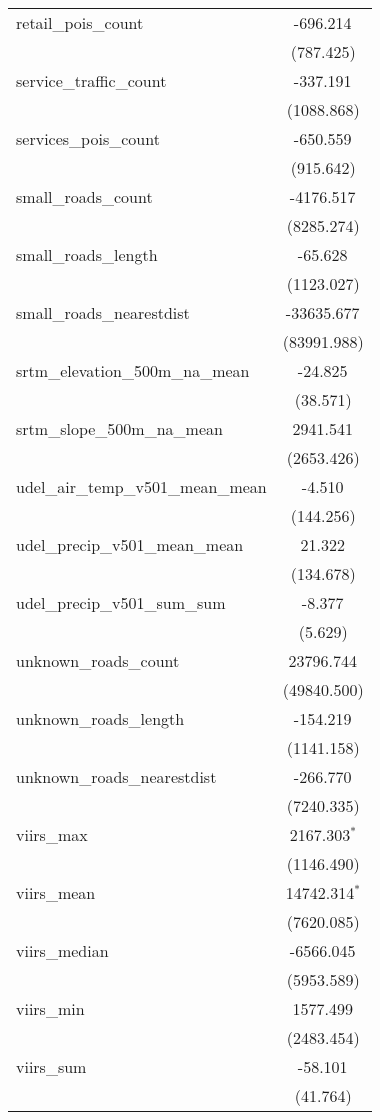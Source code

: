 \begin{table}[!htbp]
\begin{tabular}{@{\extracolsep{5pt}}lc}
 retail_pois_count & -696.214$^{}$ \\
  & (787.425) \\
 service_traffic_count & -337.191$^{}$ \\
  & (1088.868) \\
 services_pois_count & -650.559$^{}$ \\
  & (915.642) \\
 small_roads_count & -4176.517$^{}$ \\
  & (8285.274) \\
 small_roads_length & -65.628$^{}$ \\
  & (1123.027) \\
 small_roads_nearestdist & -33635.677$^{}$ \\
  & (83991.988) \\
 srtm_elevation_500m_na_mean & -24.825$^{}$ \\
  & (38.571) \\
 srtm_slope_500m_na_mean & 2941.541$^{}$ \\
  & (2653.426) \\
 udel_air_temp_v501_mean_mean & -4.510$^{}$ \\
  & (144.256) \\
 udel_precip_v501_mean_mean & 21.322$^{}$ \\
  & (134.678) \\
 udel_precip_v501_sum_sum & -8.377$^{}$ \\
  & (5.629) \\
 unknown_roads_count & 23796.744$^{}$ \\
  & (49840.500) \\
 unknown_roads_length & -154.219$^{}$ \\
  & (1141.158) \\
 unknown_roads_nearestdist & -266.770$^{}$ \\
  & (7240.335) \\
 viirs_max & 2167.303$^{*}$ \\
  & (1146.490) \\
 viirs_mean & 14742.314$^{*}$ \\
  & (7620.085) \\
 viirs_median & -6566.045$^{}$ \\
  & (5953.589) \\
 viirs_min & 1577.499$^{}$ \\
  & (2483.454) \\
 viirs_sum & -58.101$^{}$ \\
  & (41.764) \\

\end{tabular}
\end{table}
